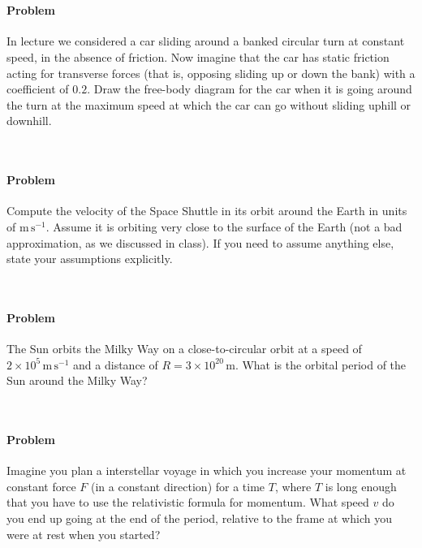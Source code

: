 \documentclass[12pt]{article}
\newcommand{\m}{\mathrm{m}}
\newcommand{\s}{\mathrm{s}}
\newcommand{\mps}{\m\,\s^{-1}}
\newcounter{problem}
\begin{document}
~ \vfill ~

\paragraph{Problem~\theproblem}%
In lecture we considered a car sliding around a banked circular turn
at constant speed, in the absence of friction.  Now imagine that the
car has static friction acting for transverse forces (that is,
opposing sliding up or down the bank) with a coefficient of $0.2$.
Draw the free-body diagram for the car when it is going around the
turn at the maximum speed at which the car can go without sliding
uphill or downhill.

~ \vfill ~

\clearpage

\paragraph{Problem~\theproblem}%
Compute the velocity of the Space Shuttle in its orbit around the
Earth in units of $\mps$.  Assume it is orbiting very close to the
surface of the Earth (not a bad approximation, as we discussed in
class).  If you need to assume anything else, state your assumptions
explicitly.

~ \vfill ~

\paragraph{Problem~\theproblem}%
The Sun orbits the Milky Way on a close-to-circular orbit at a speed
of $2\times 10^5\,\mps$ and a distance of $R= 3\times 10^{20}\,\m$.
What is the orbital period of the Sun around the Milky Way?

~ \vfill ~

\clearpage

\paragraph{Problem~\theproblem}%
Imagine you plan a interstellar voyage in which you increase your
momentum at constant force $F$ (in a constant direction) for a time
$T$, where $T$ is long enough that you have to use the relativistic
formula for momentum.  What speed $v$ do you end up going at the end
of the period, relative to the frame at which you were at rest when
you started?

~ \vfill ~
\end{document}
